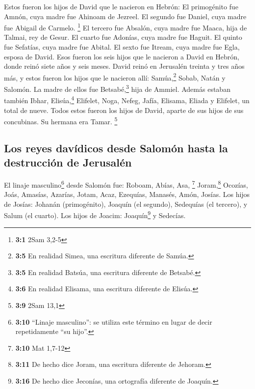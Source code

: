  Estos fueron los hijos de David que le nacieron en
Hebrón: El primogénito fue Amnón, cuya madre fue Ahinoam de Jezreel. El
segundo fue Daniel, cuya madre fue Abigail de Carmelo. \footnote{\textbf{3:1}
  2Sam 3,2-5}  El tercero fue Absalón, cuya madre fue
Maaca, hija de Talmai, rey de Gesur. El cuarto fue Adonías, cuya madre
fue Haguit.  El quinto fue Sefatías, cuya madre fue
Abital. El sexto fue Itream, cuya madre fue Egla, esposa de David.
 Esos fueron los seis hijos que le nacieron a David en
Hebrón, donde reinó siete años y seis meses. David reinó en Jerusalén
treinta y tres años más,  y estos fueron los hijos que le
nacieron allí: Samúa,\footnote{\textbf{3:5} En realidad Simea, una
  escritura diferente de Samúa.} Sobab, Natán y Salomón. La madre de
ellos fue Betsabé,\footnote{\textbf{3:5} En realidad Batsúa, una
  escritura diferente de Betsabé.} hija de Ammiel.  Además
estaban también Ibhar, Elisúa,\footnote{\textbf{3:6} En realidad
  Elisama, una escritura diferente de Elisúa.} Elifelet, 
Noga, Nefeg, Jafía,  Elisama, Eliada y Elifelet, un total
de nueve.  Todos estos fueron los hijos de David, aparte
de sus hijos de sus concubinas. Su hermana era Tamar. \footnote{\textbf{3:9}
  2Sam 13,1}

\hypertarget{los-reyes-davuxeddicos-desde-salomuxf3n-hasta-la-destrucciuxf3n-de-jerusaluxe9n}{%
\subsection{Los reyes davídicos desde Salomón hasta la destrucción de
Jerusalén}\label{los-reyes-davuxeddicos-desde-salomuxf3n-hasta-la-destrucciuxf3n-de-jerusaluxe9n}}

 El linaje masculino\footnote{\textbf{3:10} ``Linaje
  masculino'': se utiliza este término en lugar de decir repetidamente
  ``su hijo''.} desde Salomón fue: Roboam, Abías, Asa, \footnote{\textbf{3:10}
  Mat 1,7-12}  Joram,\footnote{\textbf{3:11} De hecho
  dice Joram, una escritura diferente de Jehoram.} Ocozías, Joás,
 Amasías, Azarías, Jotam,  Acaz, Ezequías,
Manasés,  Amón, Josías.  Los hijos de
Josías: Johanán (primogénito), Joaquín (el segundo), Sedequías (el
tercero), y Salum (el cuarto).  Los hijos de Joacim:
Joaquín\footnote{\textbf{3:16} De hecho dice Jeconías, una ortografía
  diferente de Joaquín.} y Sedecías.

